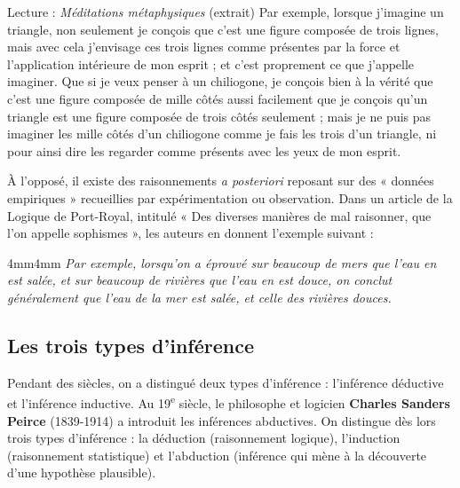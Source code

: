 \begin{lecture}{Lecture : \textit{Méditations métaphysiques} (extrait)}
Par exemple, lorsque j’imagine un triangle, non seulement je conçois que c’est une figure composée de trois lignes, mais avec cela j’envisage ces trois lignes comme présentes par la force et l’application intérieure de mon esprit ; et c’est proprement ce que j’appelle imaginer. Que si je veux penser à un chiliogone, je conçois bien à la vérité que c’est une figure composée de mille côtés aussi facilement que je conçois qu’un triangle est une figure composée de trois côtés seulement ; mais je ne puis pas imaginer les mille côtés d’un chiliogone comme je fais les trois d’un triangle, ni pour ainsi dire les regarder comme présents avec les yeux de mon esprit.
\end{lecture}

À l’opposé, il existe des raisonnements \textit{a posteriori} reposant sur des « données empiriques » recueillies par expérimentation ou observation. Dans un article de la Logique de Port-Royal, intitulé « Des diverses manières de mal raisonner, que l’on appelle sophismes », les auteurs en donnent l’exemple suivant :

\begin{adjustwidth}{4mm}{4mm}\small\itshape
Par exemple, lorsqu’on a éprouvé sur beaucoup de mers que l’eau en est salée, et sur beaucoup de rivières que l’eau en est douce, on conclut généralement que l’eau de la mer est salée, et celle des rivières douces.
\end{adjustwidth}

\subsection{Les trois types d’inférence}
Pendant des siècles, on a distingué deux types d’inférence : l’inférence déductive et l’inférence inductive. Au 19\textsuperscript{e} siècle, le philosophe et logicien \textbf{Charles Sanders Peirce} (1839-1914) a introduit les inférences abductives. On distingue dès lors trois types d’inférence : la déduction (raisonnement logique), l’induction (raisonnement statistique) et l’abduction (inférence qui mène à la découverte d’une hypothèse plausible).


